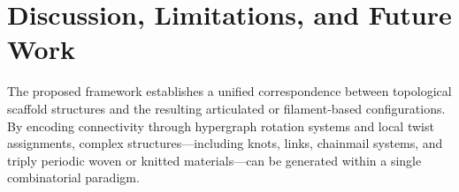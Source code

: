 \documentclass[acmtog,anonymous,review]{acmart}
\begin{document}

%
%
%     
%

\section{Discussion, Limitations, and Future Work}
\label{sec:discussion}

The proposed framework establishes a unified correspondence between topological scaffold structures and the resulting articulated or filament-based configurations. By encoding connectivity through hypergraph rotation systems and local twist assignments, complex structures---including knots, links, chainmail systems, and triply periodic woven or knitted materials---can be generated within a single combinatorial paradigm.
\end{document}
